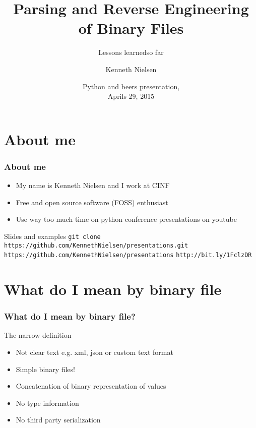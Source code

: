 \documentclass{beamer}
\title{Parsing and Reverse Engineering of Binary Files}
\subtitle{Lessons learned\newline{}\small{}so far}
\author{Kenneth Nielsen\inst{1}}
\institute
{
  \inst{1}%
  Center for Individual Nanoparticle Functionality (CINF)\\
  Institute of Physics\\
  Technical University of Denmark (DTU)
}
\date{
  Python and beers presentation,\\
  Aprils 29, 2015}
\begin{document}
\frame{\titlepage}

\section{About me}

\begin{frame}
  \frametitle{About me}
  \begin{itemize}
    \item My name is Kenneth Nielsen and I work at CINF
    \item Free and open source software (FOSS) enthusiast
    \item Use way too much time on python conference presentations on
      youtube
  \end{itemize}
  \begin{block}{Slides and examples}
    \center
    \footnotesize
    \texttt{git clone https://github.com/KennethNielsen/presentations.git}\newline
    \newline
    \texttt{https://github.com/KennethNielsen/presentations}
    \texttt{http://bit.ly/1FclzDR}
  \end{block}
\end{frame}

\section{What do I mean by binary file}

\begin{frame}
  \frametitle{What do I mean by binary file?}
  \begin{block}{The narrow definition}
    \begin{itemize}
    \item Not clear text e.g. xml, json or custom text format
    \item Simple binary files!
    \item Concatenation of binary representation of values
    \item No type information
    \item No third party serialization
    \end{itemize}
  \end{block}
\end{frame}
\end{document}
